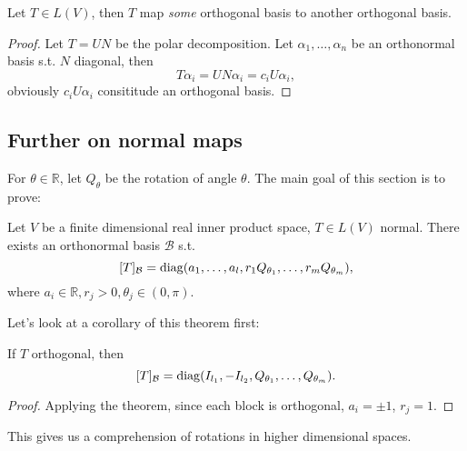\begin{corollary}
    Let $T\in L(V)$, then $T$ map \textit{some} orthogonal basis to
	another orthogonal basis.
\end{corollary}
\begin{proof}[Proof]
    Let $T = U N$ be the polar decomposition.
	Let $\alpha_1, \dots, \alpha_n$ be an orthonormal basis s.t. $N$ diagonal,
	then
	\[
	T\alpha_i = UN\alpha_i = c_i U \alpha_i,
	\]
	obviously $c_iU\alpha_i$ consititude an orthogonal basis.
\end{proof}

\subsection{Further on normal maps}
\label{sub:Further on normal maps}
For $\theta\in \mathbb{R}$, let $Q_\theta$ be the rotation of angle $\theta$.
The main goal of this section is to prove:
\begin{theorem}
    Let $V$ be a finite dimensional real inner product space, $T\in L(V)$ normal.
	There exists an orthonormal basis $ \mathcal{B}$ s.t.
	\[
		[T]_{\mathcal{B}} = \operatorname{diag}(a_1, \dots, a_l,
		r_1Q_{\theta_1}, \dots, r_mQ_{\theta_m}),
	\]
	where $a_i \in \mathbb{R}, r_j > 0, \theta_j \in (0, \pi)$.
\end{theorem}

Let's look at a corollary of this theorem first:
\begin{corollary}
    If $T$ orthogonal, then
	\[
		[T]_{\mathcal{B}} = \operatorname{diag}(I_{l_1}, -I_{l_2},
		Q_{\theta_1}, \dots, Q_{\theta_m}).
	\]
\end{corollary}
\begin{proof}[Proof]
    Applying the theorem, since each block is orthogonal, $a_i = \pm 1$, $r_j = 1$.
\end{proof}
This gives us a comprehension of rotations in higher dimensional spaces.
